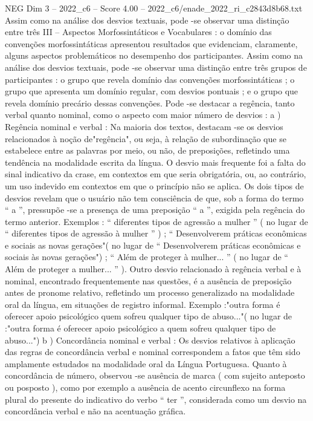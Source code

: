 \begin{textsample}{NEG Dim 3 – 2022\_c6 – Score 4.00 – 2022\_c6/enade\_2022\_ri\_c2843d8b68.txt}
Assim como na análise dos desvios textuais, pode -se observar uma distinção entre três III – Aspectos Morfossintáticos e Vocabulares : o domínio das convenções morfossintáticas apresentou resultados que evidenciam, claramente, alguns aspectos problemáticos no desempenho dos participantes.
Assim como na análise dos desvios textuais, pode -se observar uma distinção entre três grupos de participantes : o grupo que revela domínio das convenções morfossintáticas ; o grupo que apresenta um domínio regular, com desvios pontuais ; e o grupo que revela domínio precário dessas convenções.
Pode -se destacar a regência, tanto verbal quanto nominal, como o aspecto com maior número de desvios : a ) Regência nominal e verbal : Na maioria dos textos, destacam -se os desvios relacionados à noção de"regência", ou seja, à relação de subordinação que se estabelece entre as palavras por meio, ou não, de preposições, refletindo uma tendência na modalidade escrita da língua.
O desvio mais frequente foi a falta do sinal indicativo da crase, em contextos em que seria obrigatória, ou, ao contrário, um uso indevido em contextos em que o princípio não se aplica.
Os dois tipos de desvios revelam que o usuário não tem consciência de que, sob a forma do termo “ a ”, pressupõe -se a presença de uma preposição “ a ”, exigida pela regência do termo anterior.
Exemplos : “ diferentes tipos de agressão a mulher ” ( no lugar de “ diferentes tipos de agressão à mulher ” ) ; “ Desenvolverem práticas econômicas e sociais as novas gerações"( no lugar de “ Desenvolverem práticas econômicas e sociais às novas gerações") ; “ Além de proteger à mulher... ” ( no lugar de “ Além de proteger a mulher... ” ).
Outro desvio relacionado à regência verbal e à nominal, encontrado frequentemente nas questões, é a ausência de preposição antes de pronome relativo, refletindo um processo generalizado na modalidade oral da língua, em situações de registro informal.
Exemplo :"outra forma é oferecer apoio psicológico quem sofreu qualquer tipo de abuso..."( no lugar de :"outra forma é oferecer apoio psicológico a quem sofreu qualquer tipo de abuso...") b ) Concordância nominal e verbal : Os desvios relativos à aplicação das regras de concordância verbal e nominal correspondem a fatos que têm sido amplamente estudados na modalidade oral da Língua Portuguesa.
Quanto à concordância de número, observou -se ausência de marca ( com sujeito anteposto ou posposto ), como por exemplo a ausência de acento circunflexo na forma plural do presente do indicativo do verbo “ ter ”, considerada como um desvio na concordância verbal e não na acentuação gráfica.

\end{textsample}
